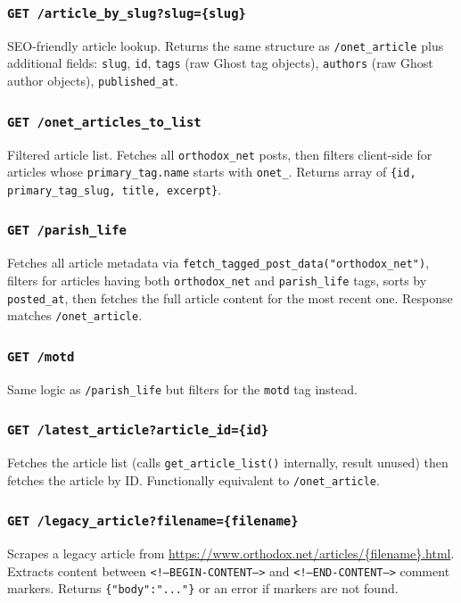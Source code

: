 \documentclass[12pt]{article}
\begin{document}
\subsubsection{\texttt{GET /article\_by\_slug?slug=\{slug\}}}
SEO-friendly article lookup. Returns the same structure as \texttt{/onet\_article} plus additional fields: \texttt{slug}, \texttt{id}, \texttt{tags} (raw Ghost tag objects), \texttt{authors} (raw Ghost author objects), \texttt{published\_at}.

\subsubsection{\texttt{GET /onet\_articles\_to\_list}}
Filtered article list. Fetches all \texttt{orthodox\_net} posts, then filters client-side for articles whose \texttt{primary\_tag.name} starts with \texttt{onet\_}. Returns array of \texttt{\{id, primary\_tag\_slug, title, excerpt\}}.

\subsubsection{\texttt{GET /parish\_life}}
Fetches all article metadata via \texttt{fetch\_tagged\_post\_data("orthodox\_net")}, filters for articles having both \texttt{orthodox\_net} and \texttt{parish\_life} tags, sorts by \texttt{posted\_at}, then fetches the full article content for the most recent one. Response matches \texttt{/onet\_article}.

\subsubsection{\texttt{GET /motd}}
Same logic as \texttt{/parish\_life} but filters for the \texttt{motd} tag instead.

\subsubsection{\texttt{GET /latest\_article?article\_id=\{id\}}}
Fetches the article list (calls \texttt{get\_article\_list()} internally, result unused) then fetches the article by ID. Functionally equivalent to \texttt{/onet\_article}.

\subsubsection{\texttt{GET /legacy\_article?filename=\{filename\}}}
Scrapes a legacy article from \url{https://www.orthodox.net/articles/{filename}.html}. Extracts content between \texttt{<!--BEGIN-CONTENT-->} and \texttt{<!--END-CONTENT-->} comment markers. Returns \texttt{\{"body":"..."\}} or an error if markers are not found.
\end{document}
